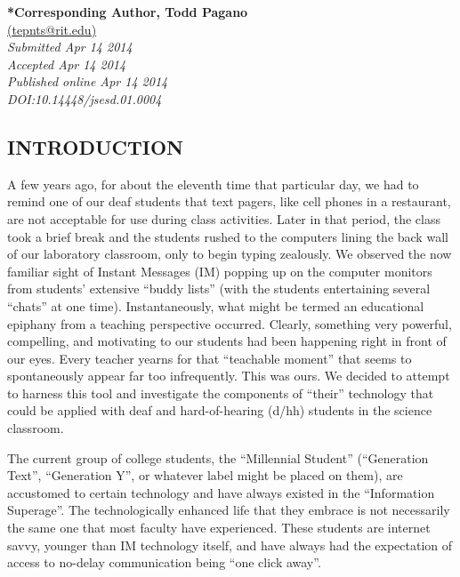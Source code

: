 \documentclass[11.5pt]{sig-alternate} %
\begin{document}
\textbf{*Corresponding Author, Todd Pagano }\\
\href{mailto: tepnts@rit.edu }{(tepnts@rit.edu)} \\
\textit{Submitted  Apr 14 2014}\\
\textit{Accepted Apr 14 2014} \\
\textit{Published online Apr 14 2014} \\
\textit{DOI:10.14448/jsesd.01.0004} \\
\pagebreak
\clearpage
\begin{large}
\section*{INTRODUCTION}
A few years ago, for about the eleventh time that particular day, we had to remind one of our deaf students that text pagers, like cell phones in a restaurant, are not acceptable for use during class activities. Later in that period, the class took a brief break and the students rushed to the computers lining the back wall of our laboratory classroom, only to begin typing zealously. We observed the now familiar sight of Instant Messages (IM) popping up on the computer monitors from students’ extensive “buddy lists” (with the students entertaining several “chats” at one time). Instantaneously, what might be termed an educational epiphany from a teaching perspective occurred. Clearly, something very powerful, compelling, and motivating to our students had been happening right in front of our eyes. Every teacher yearns for that ``teachable moment'' that seems to spontaneously appear far too infrequently. This was ours. We decided to attempt to harness this tool and investigate the components of ``their'' technology that could be applied with deaf and hard-of-hearing (d/hh) students in the science classroom. 

The current group of college students, the “Millennial Student” (“Generation Text”, “Generation Y”, or whatever label might be placed on them), are accustomed to certain technology and have always existed in the “Information Superage”. The technologically enhanced life that they embrace is not necessarily the same one that most faculty have experienced. These students are internet savvy, younger than IM technology itself, and have always had the expectation of access to no-delay communication being “one click away”. 


\end{large}
\end{document}

